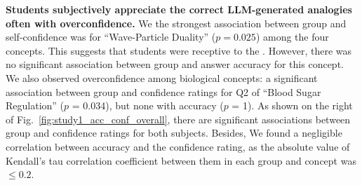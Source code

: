 \textbf{Students subjectively appreciate the correct LLM-generated analogies often with overconfidence.}
We  the strongest association between group and self-confidence was for ``Wave-Particle Duality'' ($p = 0.025$) among the four concepts. 
This suggests that students were receptive to the . 
However, there was no significant association between group and answer accuracy for this concept. 
We also observed overconfidence among  biological concepts: a significant association between group and confidence ratings for Q2 of “Blood Sugar Regulation” ($p$ = 0.034), but none with accuracy ($p$ = 1).
As shown on the right of Fig.~\ref{fig:study1_acc_conf_overall}, there are significant associations between group and confidence ratings for both subjects.
Besides, We found a negligible correlation between accuracy and the confidence rating, as the absolute value of Kendall's tau correlation coefficient between them in each group and concept was $\leq0.2$.




